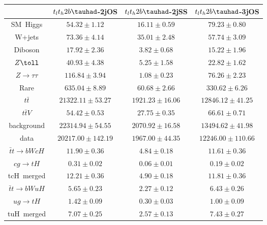 \centering
\begin{tabular}{|c|c|c|c|} \hline
 & $t_{l}t_{h}2b\tauhad$-2jOS & $t_{l}t_{h}2b\tauhad$-2jSS & $t_{l}t_{h}2b\tauhad$-3jOS\\\hline
SM~Higgs & $54.32\pm1.12$ & $16.11\pm0.59$ & $79.23\pm0.80$\\\hline
W+jets & $73.36\pm4.14$ & $35.01\pm2.48$ & $57.74\pm3.09$\\\hline
Diboson & $17.92\pm2.36$ & $3.82\pm0.68$ & $15.22\pm1.96$\\\hline
$Z\toll$ & $40.93\pm4.38$ & $5.25\pm1.58$ & $22.82\pm1.62$\\\hline
$Z\to\tau\tau$ & $116.84\pm3.94$ & $1.08\pm0.23$ & $76.26\pm2.23$\\\hline
Rare & $635.04\pm8.89$ & $60.68\pm2.66$ & $330.62\pm6.26$\\\hline
$t\bar{t}$ & $21322.11\pm53.27$ & $1921.23\pm16.06$ & $12846.12\pm41.25$\\\hline
$t\bar{t}V$ & $54.42\pm0.53$ & $27.75\pm0.35$ & $66.61\pm0.71$\\\hline
background & $22314.94\pm54.55$ & $2070.92\pm16.58$ & $13494.62\pm41.98$\\\hline
data & $20217.00\pm142.19$ & $1967.00\pm44.35$ & $12246.00\pm110.66$\\\hline
$\bar{t}t\to bWcH$ & $11.90\pm0.36$ & $4.84\pm0.18$ & $11.61\pm0.36$\\\hline
$cg\to tH$ & $0.31\pm0.02$ & $0.06\pm0.01$ & $0.19\pm0.02$\\\hline
tcH~merged & $12.21\pm0.36$ & $4.90\pm0.18$ & $11.81\pm0.36$\\\hline
$\bar{t}t\to bWuH$ & $5.65\pm0.23$ & $2.27\pm0.12$ & $6.43\pm0.26$\\\hline
$ug\to tH$ & $1.42\pm0.09$ & $0.30\pm0.03$ & $1.00\pm0.09$\\\hline
tuH~merged & $7.07\pm0.25$ & $2.57\pm0.13$ & $7.43\pm0.27$\\\hline
\end{tabular}
